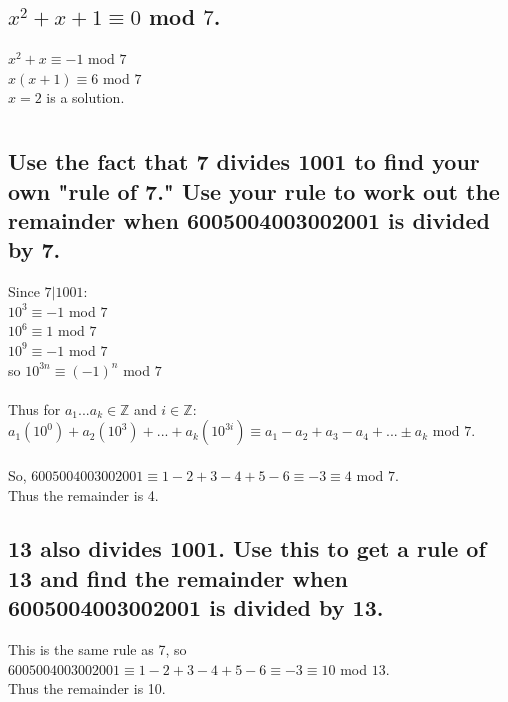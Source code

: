 \documentclass[12pt]{article}
\begin{document}
\subsection{$x^2 + x + 1 \equiv 0$ mod $7$.}
$x^2 + x \equiv -1$ mod $7$\\
$x(x+1) \equiv 6$ mod $7$\\
$x = 2$ is a solution.

\setcounter{section}{4}

\section{}
\subsection{
    Use the fact that 7 divides 1001 to find your own "rule of 7."
    Use your rule to work out the remainder when 6005004003002001 is divided by 7.
}
Since $7|1001$:\\
$10^3 \equiv -1$ mod $7$\\
$10^6 \equiv 1$ mod $7$\\
$10^9 \equiv -1$ mod $7$\\
so $10^{3n} \equiv (-1)^n$ mod $7$\\\\
Thus for $a_1 ... a_k \in \mathds{Z}$ and $i \in \mathds{Z}$:\\
$a_1(10^0) + a_2(10^3) + ... + a_k(10^{3i}) \equiv a_1 - a_2 + a_3 - a_4 + ... \pm a_k$ mod $7$.\\\\
So, $6005004003002001 \equiv 1-2+3-4+5-6 \equiv -3 \equiv 4$ mod $7$.\\
Thus the remainder is 4.

\subsection{
    13 also divides 1001. Use this to get a rule of 13 and find the remainder when 6005004003002001 is divided by 13.
}
This is the same rule as 7, so $6005004003002001 \equiv 1-2+3-4+5-6 \equiv -3 \equiv 10$ mod $13$.\\
Thus the remainder is 10.
\end{document}
